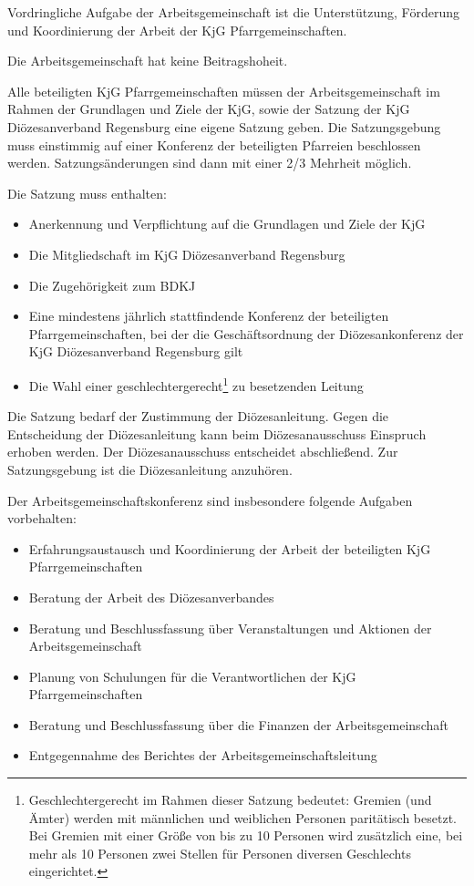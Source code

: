 \documentclass[12pt]{report}
\begin{document}
\begin{flushleft}
Vordringliche Aufgabe der Arbeitsgemeinschaft ist die Unterstützung, Förderung und Koordinierung
der Arbeit der KjG Pfarrgemeinschaften.

Die Arbeitsgemeinschaft hat keine Beitragshoheit.

Alle beteiligten KjG Pfarrgemeinschaften müssen der Arbeitsgemeinschaft im Rahmen der Grundlagen
und Ziele der KjG, sowie der Satzung der KjG Diözesanverband Regensburg eine eigene
Satzung geben. Die Satzungsgebung muss einstimmig auf einer Konferenz der beteiligten Pfarreien
beschlossen werden. Satzungsänderungen sind dann mit einer 2/3 Mehrheit möglich.

Die Satzung muss enthalten:
\begin{itemize}
  \item Anerkennung und Verpflichtung auf die Grundlagen und Ziele der KjG
  \item Die Mitgliedschaft im KjG Diözesanverband Regensburg
  \item Die Zugehörigkeit zum BDKJ
  \item Eine mindestens jährlich stattfindende Konferenz der beteiligten Pfarrgemeinschaften, bei der
        die Geschäftsordnung der Diözesankonferenz der KjG Diözesanverband Regensburg gilt
  \item Die Wahl einer geschlechtergerecht\footnote{Geschlechtergerecht im Rahmen dieser Satzung bedeutet: Gremien (und Ämter) werden mit männlichen und
weiblichen Personen paritätisch besetzt. Bei Gremien mit einer Größe von bis zu 10 Personen wird zusätzlich
eine, bei mehr als 10 Personen zwei Stellen für Personen diversen Geschlechts eingerichtet.} zu besetzenden Leitung
\end{itemize}

Die Satzung bedarf der Zustimmung der Diözesanleitung. Gegen die Entscheidung der Diözesanleitung
kann beim Diözesanausschuss Einspruch erhoben werden. Der Diözesanausschuss entscheidet
abschließend. Zur Satzungsgebung ist die Diözesanleitung
anzuhören.

Der Arbeitsgemeinschaftskonferenz sind insbesondere folgende Aufgaben vorbehalten:
\begin{itemize}
  \item Erfahrungsaustausch und Koordinierung der Arbeit der beteiligten KjG Pfarrgemeinschaften
  \item Beratung der Arbeit des Diözesanverbandes
  \item Beratung und Beschlussfassung über Veranstaltungen und Aktionen der Arbeitsgemeinschaft
  \item Planung von Schulungen für die Verantwortlichen der KjG Pfarrgemeinschaften
  \item Beratung und Beschlussfassung über die Finanzen der Arbeitsgemeinschaft
  \item Entgegennahme des Berichtes der Arbeitsgemeinschaftsleitung
\end{itemize}

\end{flushleft}
\end{document}

